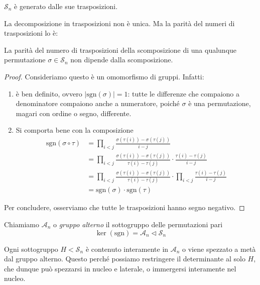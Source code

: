 \begin{multicols}{2}
\begin{remark}
	$ \mathcal{S}_n $ è generato dalle sue trasposizioni.
\end{remark}
\begin{remark}
	La decomposizione in trasposizioni non è unica. Ma la parità del numeri di trasposizioni lo è:
\end{remark}
\begin{theorem}
	La parità del numero di trasposizioni della scomposizione di una qualunque permutazione $ \sigma \in \mathcal{S}_n $ non dipende dalla scomposizione.
\end{theorem}
\begin{proof}
	Consideriamo
	questo è un omomorfismo di gruppi. Infatti:
	\begin{enumerate}
		\item è ben definito, ovvero $ |\text{sgn}(\sigma)| = 1 $: tutte le differenze che compaiono a denominatore compaiono anche a numeratore, poiché $ \sigma $ è una permutazione, magari con ordine o segno, differente.
		\item Si comporta bene con la composizione
		\begin{align*}
			\text{sgn}(\sigma \circ \tau) &= \prod_{i < j}\frac{\sigma(\tau(i))-\sigma(\tau(j))}{i-j} \\
			& = \prod_{i < j}\frac{\sigma(\tau(i))-\sigma(\tau(j))}{\tau(i)-\tau(j)}\cdot \frac{\tau(i)-\tau(j)}{i-j} \\
			& = \prod_{i < j}\frac{\sigma(\tau(i))-\sigma(\tau(j))}{\tau(i)-\tau(j)}\cdot\prod_{i < j} \frac{\tau(i)-\tau(j)}{i-j}\\
			& = \text{sgn}(\sigma)\cdot \text{sgn}(\tau)
		\end{align*}
	\end{enumerate}
	Per concludere, osserviamo che tutte le trasposizioni hanno segno negativo. 
\end{proof}
\begin{definition}
	Chiamiamo $ \mathcal{A}_n $ o \emph{gruppo alterno} il sottogruppo delle permutazioni pari
	\[ \ker(\text{sgn}) = \mathcal{A}_n \lhd \mathcal{S}_n \]
\end{definition}
\begin{remark}
	Ogni sottogruppo $ H < \mathcal{S}_n $ è contenuto interamente in $ \mathcal{A}_n $ o viene spezzato a metà dal gruppo alterno. Questo perché possiamo restringere il determinante al solo $ H $, che dunque può spezzarsi in nucleo e laterale, o immergersi interamente nel nucleo.
\end{remark}


\end{multicols}
